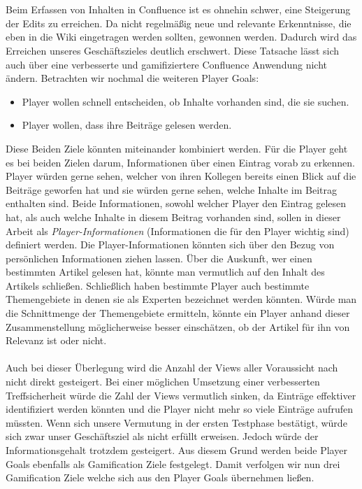 \documentclass[a4paper,12pt,twoside]{scrartcl}
\begin{document}
\\\\
Beim Erfassen von Inhalten in Confluence ist es ohnehin schwer, eine Steigerung der Edits zu erreichen. Da nicht regelmäßig neue und relevante Erkenntnisse, die eben in die Wiki eingetragen werden sollten, gewonnen werden. Dadurch wird das Erreichen unseres Geschäftszieles deutlich erschwert. Diese Tatsache lässt sich auch über eine verbesserte und gamifiziertere Confluence Anwendung nicht ändern. Betrachten wir nochmal die weiteren Player Goals:
\begin{itemize} 
      \item Player wollen schnell entscheiden, ob Inhalte vorhanden sind, die sie suchen.
      \item Player wollen, dass ihre Beiträge gelesen werden.
\end{itemize}    
Diese Beiden Ziele könnten miteinander kombiniert werden. Für die Player geht es bei beiden Zielen darum, Informationen über einen Eintrag vorab zu erkennen. Player würden gerne sehen, welcher von ihren Kollegen bereits einen Blick auf die Beiträge geworfen hat und sie würden gerne sehen, welche Inhalte im Beitrag enthalten sind. Beide Informationen, sowohl welcher Player den Eintrag gelesen hat, als auch welche Inhalte in diesem Beitrag vorhanden sind, sollen in dieser Arbeit als \textit{Player-Informationen} (Informationen die für den Player wichtig sind) definiert werden. Die Player-Informationen könnten sich über den Bezug von persönlichen Informationen ziehen lassen. Über die Auskunft, wer einen bestimmten Artikel gelesen hat, könnte man vermutlich auf den Inhalt des Artikels schließen. Schließlich haben bestimmte Player auch bestimmte Themengebiete in denen sie als Experten bezeichnet werden könnten. Würde man die Schnittmenge der Themengebiete ermitteln, könnte ein Player anhand dieser Zusammenstellung möglicherweise besser einschätzen, ob der Artikel für ihn von Relevanz ist oder nicht.
\\\\
Auch bei dieser Überlegung wird die Anzahl der Views aller Voraussicht nach nicht direkt gesteigert. Bei einer möglichen Umsetzung einer verbesserten Treffsicherheit würde die Zahl der Views vermutlich sinken, da Einträge effektiver identifiziert werden könnten und die Player nicht mehr so viele Einträge aufrufen müssten. Wenn sich unsere Vermutung in der ersten Testphase bestätigt, würde sich zwar unser Geschäftsziel als nicht erfüllt erweisen. Jedoch würde der Informationsgehalt trotzdem gesteigert. Aus diesem Grund werden beide Player Goals ebenfalls als Gamification Ziele festgelegt. Damit verfolgen wir nun drei Gamification Ziele welche sich aus den Player Goals übernehmen ließen.   
\end{document}
